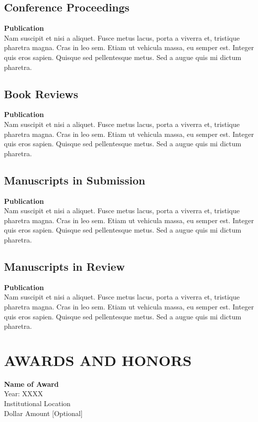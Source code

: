 \documentclass[a4paper,9pt]{extarticle}
\begin{document}
\subsection*{Conference Proceedings}
\textbf{Publication} \\ 
Nam suscipit et nisi a aliquet. Fusce metus lacus, porta a viverra et, tristique pharetra magna. Cras in leo sem. Etiam ut vehicula massa, eu semper est. Integer quis eros sapien. Quisque sed pellentesque metus. Sed a augue quis mi dictum pharetra. 

\subsection*{Book Reviews}
\textbf{Publication} \\ 
Nam suscipit et nisi a aliquet. Fusce metus lacus, porta a viverra et, tristique pharetra magna. Cras in leo sem. Etiam ut vehicula massa, eu semper est. Integer quis eros sapien. Quisque sed pellentesque metus. Sed a augue quis mi dictum pharetra. 

\subsection*{Manuscripts in Submission}
\textbf{Publication} \\ 
Nam suscipit et nisi a aliquet. Fusce metus lacus, porta a viverra et, tristique pharetra magna. Cras in leo sem. Etiam ut vehicula massa, eu semper est. Integer quis eros sapien. Quisque sed pellentesque metus. Sed a augue quis mi dictum pharetra. 

\subsection*{Manuscripts in Review}
\textbf{Publication} \\ 
Nam suscipit et nisi a aliquet. Fusce metus lacus, porta a viverra et, tristique pharetra magna. Cras in leo sem. Etiam ut vehicula massa, eu semper est. Integer quis eros sapien. Quisque sed pellentesque metus. Sed a augue quis mi dictum pharetra. 


\section*{AWARDS AND HONORS}

\noindent
\newline
\textbf{Name of Award} \\
Year: XXXX \\
Institutional Location \\
Dollar Amount [Optional]  \\
\end{document}
